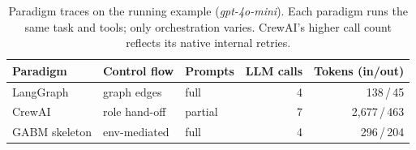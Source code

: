 \begin{table}[t]
\centering\footnotesize
\renewcommand{\arraystretch}{0.95}
\setlength{\tabcolsep}{5pt}
\caption{Paradigm traces on the running example (\emph{gpt-4o-mini}). Each paradigm runs the same task and tools; only orchestration varies. CrewAI's higher call count reflects its native internal retries.}
\label{tab:paradigm-traces}
\begin{tabular}{lllrr}
\toprule
Paradigm & Control flow & Prompts & LLM calls & Tokens (in/out) \\
\midrule
LangGraph      & graph edges   & full    & 4 & 138\,/\,45 \\
CrewAI         & role hand-off & partial & 7 & 2{,}677\,/\,463 \\
GABM skeleton  & env-mediated  & full    & 4 & 296\,/\,204 \\
\bottomrule
\end{tabular}
\vspace{-3mm}
\end{table}
